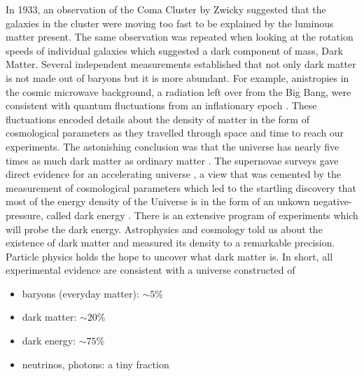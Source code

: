In 1933, an observation of the Coma Cluster by Zwicky suggested that the galaxies in the cluster were moving too fast to be explained 
by the luminous matter present. The same observation was repeated when looking at the rotation speeds of individual galaxies which 
suggested a dark component of mass, Dark Matter. 
Several independent measurements established that 
not only dark matter is not made out of baryons but it is more 
abundant. 
For example, anistropies in the cosmic microwave background, a radiation 
left over from the Big Bang, were consistent with 
quantum fluctuations from an inflationary epoch \cite{Hu:2001bc,2009AIPC}. 
These fluctuations encoded details about the density of matter 
in the form of 
cosmological parameters as they travelled through space and time to reach 
our experiments.
The astonishing conclusion was that the universe has nearly five times 
as much dark matter as ordinary matter \cite{Bertone:2004pz}.
The supernovae surveys gave direct evidence for an accelerating universe
 \cite{Perlmutter:1998np},
a view that was cemented by the measurement of cosmological parameters
\cite{Adam:2015rua,Ade:2015xua}
which led to the startling discovery that most of the energy density of 
the Universe is in the 
form of an unkown negative-pressure, called dark energy \cite{Scranton:2003in}.
There is an extensive program of experiments 
which will probe the dark energy.%
Astrophysics and cosmology told us about 
the existence of dark matter and measured its density to a remarkable 
precision. Particle physics holds the hope to uncover what dark matter is.
In short, all experimental evidence are consistent with a universe 
constructed of 
\begin{itemize}
\item baryons (everyday matter): $\sim 5\%$ 
\item dark matter: $\sim 20\%$ 
\item dark energy: $\sim 75\%$ 
\item neutrinos, photons: a tiny fraction
\end{itemize}

